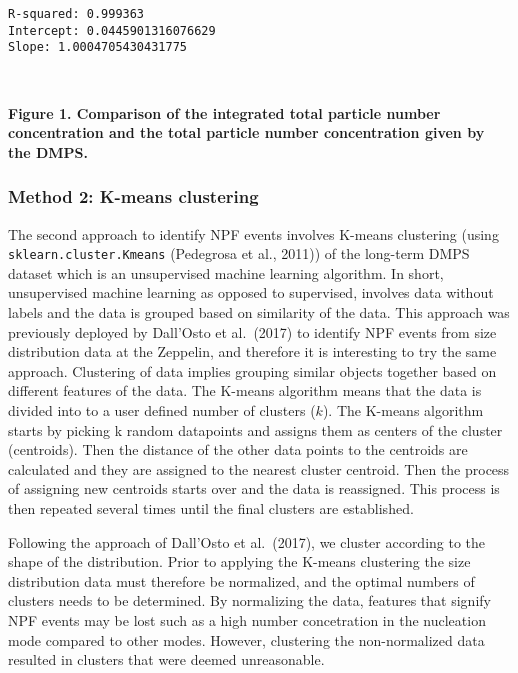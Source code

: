 \documentclass[11pt]{article}
\begin{document}
    \begin{Verbatim}[commandchars=\\\{\}]
R-squared: 0.999363
Intercept: 0.0445901316076629
Slope: 1.0004705430431775
    \end{Verbatim}

    \begin{center}
    \end{center}
    { \hspace*{\fill} \\}
    
    \textbf{Figure 1. Comparison of the integrated total particle number
concentration and the total particle number concentration given by the
DMPS.}

    \hypertarget{method-2-k-means-clustering}{%
\subsubsection{Method 2: K-means
clustering}\label{method-2-k-means-clustering}}

    The second approach to identify NPF events involves K-means clustering
(using \texttt{sklearn.cluster.Kmeans} (Pedegrosa et al., 2011)) of the
long-term DMPS dataset which is an unsupervised machine learning
algorithm. In short, unsupervised machine learning as opposed to
supervised, involves data without labels and the data is grouped based
on similarity of the data. This approach was previously deployed by
Dall'Osto et al.~(2017) to identify NPF events from size distribution
data at the Zeppelin, and therefore it is interesting to try the same
approach. Clustering of data implies grouping similar objects together
based on different features of the data. The K-means algorithm means
that the data is divided into to a user defined number of clusters
(\(k\)). The K-means algorithm starts by picking k random datapoints and
assigns them as centers of the cluster (centroids). Then the distance of
the other data points to the centroids are calculated and they are
assigned to the nearest cluster centroid. Then the process of assigning
new centroids starts over and the data is reassigned. This process is
then repeated several times until the final clusters are established.

Following the approach of Dall'Osto et al.~(2017), we cluster according
to the shape of the distribution. Prior to applying the K-means
clustering the size distribution data must therefore be normalized, and
the optimal numbers of clusters needs to be determined. By normalizing
the data, features that signify NPF events may be lost such as a high
number concetration in the nucleation mode compared to other modes.
However, clustering the non-normalized data resulted in clusters that
were deemed unreasonable.
\end{document}
